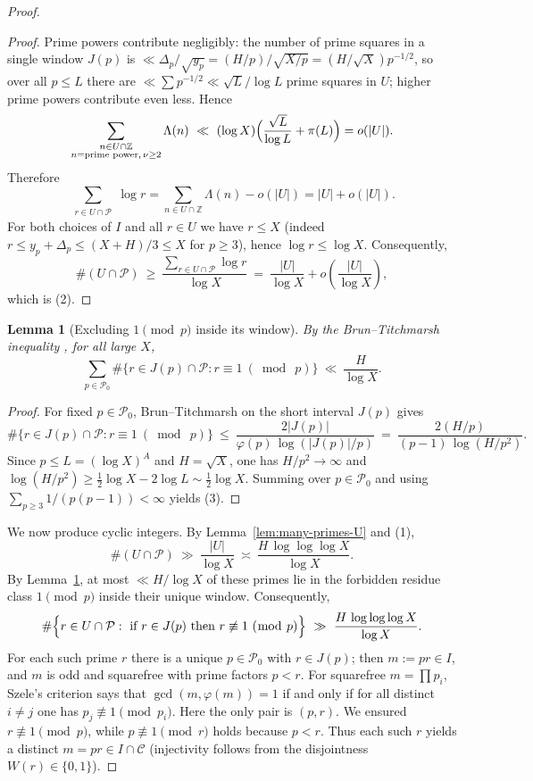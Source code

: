 \documentclass[12pt]{article}
\renewcommand{\tag}[1]{}
\newtheorem{lemma}{Lemma}[theorem]
\theoremstyle{remark}
\begin{document}
\begin{proof}
\begin{proof}
Prime powers contribute negligibly: the number of prime squares in a single window $J(p)$ is $\ll \Delta_p/\sqrt{y_p}= (H/p)/\sqrt{X/p}=(H/\sqrt X)p^{-1/2}$, so over all $p\le L$ there are $\ll \sum p^{-1/2}\ll \sqrt L/\log L$ prime squares in $U$; higher prime powers contribute even less. Hence
$$
\sum_{\substack{n\in U\cap\mathbb Z\\ n=\text{prime power},\,\nu\ge2}}\Lambda(n)\ \ll\ (\log X)\Bigl(\frac{\sqrt L}{\log L}+\pi(L)\Bigr)
= o(|U|).
$$
Therefore
$$
\sum_{\substack{r\in U\cap\mathcal P}}\log r
= \sum_{n\in U\cap\mathbb Z}\Lambda(n) - o(|U|)
= |U|+o(|U|).
$$
For both choices of $I$ and all $r\in U$ we have $r\le X$ (indeed $r\le y_p+\Delta_p\le (X+H)/3\le X$ for $p\ge3$), hence $\log r\le\log X$. Consequently,
$$
\#(U\cap\mathcal P)\ \ge\ \frac{\sum_{r\in U\cap\mathcal P}\log r}{\log X}
\ =\ \frac{|U|}{\log X}+o\!\left(\frac{|U|}{\log X}\right),
$$
which is (2).
\end{proof}

\begin{lemma}[Excluding $1\pmod p$ inside its window]\label{lem:exclude-one-mod-p}
By the Brun--Titchmarsh inequality \cite{MV2007}, for all large $X$,
$$
\sum_{p\in\mathcal P_0}\#\{r\in J(p)\cap\mathcal P: r\equiv1\ (\bmod\ p)\}
\ \ll\ \frac{H}{\log X}.\tag{3}
$$
\end{lemma}

\begin{proof}
For fixed $p\in\mathcal P_0$, Brun--Titchmarsh on the short interval $J(p)$ gives
$$
\#\{r\in J(p)\cap\mathcal P: r\equiv1\ (\bmod\ p)\}
\ \le\ \frac{2|J(p)|}{\varphi(p)\,\log(|J(p)|/p)}
\ =\ \frac{2(H/p)}{(p-1)\,\log(H/p^2)}.
$$
Since $p\le L=(\log X)^A$ and $H=\sqrt X$, one has $H/p^2\to\infty$ and $\log(H/p^2)\ge \tfrac12\log X-2\log L\sim \tfrac12\log X$. Summing over $p\in\mathcal P_0$ and using $\sum_{p\ge3}1/(p(p-1))<\infty$ yields (3).
\end{proof}

We now produce cyclic integers. By Lemma~\ref{lem:many-primes-U} and (1),
$$
\#(U\cap\mathcal P)\ \gg\ \frac{|U|}{\log X}\ \asymp\ \frac{H\,\log\log\log X}{\log X}.
$$
By Lemma~\ref{lem:exclude-one-mod-p}, at most $\ll H/\log X$ of these primes lie in the forbidden residue class $1\pmod p$ inside their unique window. Consequently,
$$
\#\Bigl\{r\in U\cap\mathcal P:\ \text{if }r\in J(p)\text{ then }r\not\equiv1\ (\bmod\ p)\Bigr\}
\ \gg\ \frac{H\,\log\log\log X}{\log X}.
$$
For each such prime $r$ there is a unique $p\in\mathcal P_0$ with $r\in J(p)$; then $m:=pr\in I$, and $m$ is odd and squarefree with prime factors $p<r$. For squarefree $m=\prod p_i$, Szele's criterion \cite{Szele1947} says that $\gcd(m,\varphi(m))=1$ if and only if for all distinct $i\ne j$ one has $p_j\not\equiv1\pmod{p_i}$. Here the only pair is $(p,r)$. We ensured $r\not\equiv1\pmod p$, while $p\not\equiv1\pmod r$ holds because $p<r$. Thus each such $r$ yields a distinct $m=pr\in I\cap\mathcal C$ (injectivity follows from the disjointness $W(r)\in\{0,1\}$).


\end{proof}
\end{document}
